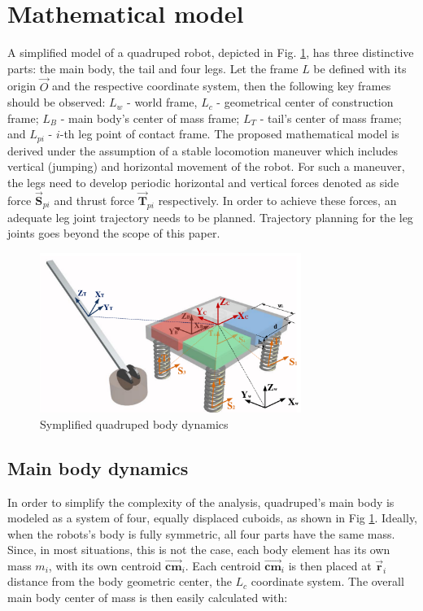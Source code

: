\section{Mathematical model}\label{sec:MathModel}
A simplified model of a quadruped robot, depicted in Fig. \ref{fig:rmoment}, has three distinctive parts: the main body, the tail and four legs. Let the frame $L$ be defined with its origin $\vec{O}$ and the respective coordinate system, then the following key frames should be observed: $L_w$ - world frame, $L_c$ - geometrical center of construction frame; $L_B$ - main body's center of mass frame; $L_T$ - tail's center of mass frame; and $L_{pi}$ - $i$-th leg point of contact frame. The proposed mathematical model is derived under the assumption of a stable locomotion maneuver which includes vertical (jumping) and horizontal movement of the robot. For such a maneuver, the legs need to develop periodic horizontal and vertical forces denoted as side force $\vec{\textbf{S}}_{pi}$ and thrust force $\vec{\textbf{T}}_{pi}$ respectively. In order to achieve these forces, an adequate leg joint trajectory needs to be planned. Trajectory planning for the leg joints goes beyond the scope of this paper. 

\begin{figure}
	\centering
	\includegraphics[width=85mm]{./pictures/RobinMoment.pdf}
	\caption{Symplified quadruped body dynamics}
	\label{fig:rmoment}
\end{figure}

\subsection{Main body dynamics}
In order to simplify the complexity of the analysis, quadruped's main body is modeled as a system of four, equally displaced cuboids, as shown in Fig \ref{fig:rmoment}. Ideally, when the robots's body is fully symmetric, all four parts have the same mass. Since, in most situations, this is not the case, each body element has its own mass $m_i$, with its own centroid $\vec{\textbf{cm}}_i$. Each centroid $\vec{\textbf{cm}}_i$ is then placed at $\vec{\textbf{r}}_i$ distance from the body geometric center, the $L_c$ coordinate system. The overall main body center of mass is then easily calculated with:
 
